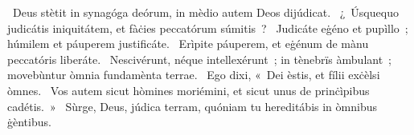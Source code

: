 \psalmChapterWithInscription{}
{ }
{%
~Deus stètit in synagóga deórum, in mèdio autem Deos dijúdicat. 
~¿~Úsquequo judicátis iniquitátem, et fàċies peccatórum súmitis~? 
~Judicáte eġéno et pupìllo~; húmilem et páuperem justificáte. 
~Erìpite páuperem, et eġénum de mànu peccatóris liberáte. 
~Nescivérunt, néque intellexérunt~; in tènebrïs àmbulant~; movebùntur òmnia fundamènta terrae. 
~Ego dixi, «~Dei èstis, et fílii exċèlsi òmnes. 
~Vos autem sicut hòmines moriémini, et sicut unus de prinċìpibus cadétis.~»
~Sùrge, Deus, júdica terram, quóniam tu hereditábis in òmnibus ġèntibus. 
}
